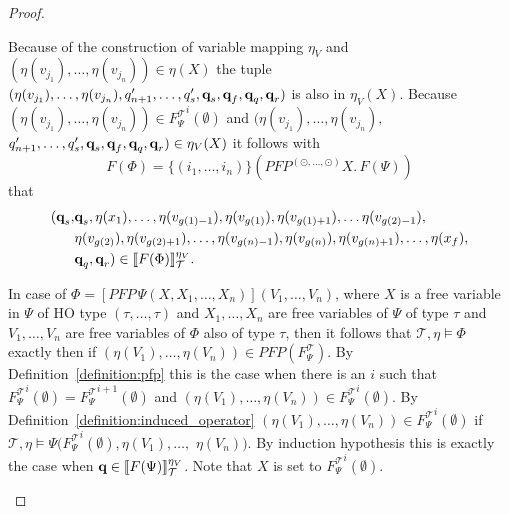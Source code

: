 \begin{proof}
\begin{compactitem}
		Because of the construction of variable mapping $\eta_V$ and $(\eta(v_{j_1}), \dots, 
        \eta(v_{j_n})) \in \eta(X)$ the
        tuple $(\eta(v_{j_1}), \dots, \eta(v_{j_n}), q_{n+1}', \dots, q_s', \emph{q}_s, \emph{q}_f,  
        \emph{q}_q,  \emph{q}_r)$ is also in $\eta_V(X)$.
         Because $(\eta(v_{j_1}), \dots, \eta(v_{j_n})) \in {F_\Psi^\mathcal{T}}^i(\emptyset)$ and $(\eta(v_{j_1}), \dots, \eta(v_{j_n}), $ $q_{n+1}', \dots, q_s', \emph{q}_s, \emph{q}_f,  
        \emph{q}_q,  \emph{q}_r) \in \eta_V(X)$ it follows with 
        \[F(\Phi) = \{(i_1, \dots, i_n)\} (PFP^{(\odot, \dots, \odot)} X.\, F(\Psi)) \]
        that 
        \begin{align*}
        (\emph{q}_s, &\emph{q}_s, \eta(x_1), \dots, \eta(v_{g(1)-1}), \eta(v_{g(1)}), \eta(v_{g(1)+1}), \dots \eta(v_{g(2)-1}),\\& \eta
            (v_{g(2)}), \eta(v_{g(2)+1}), \dots, \eta(v_{g(n)-1}), \eta(v_{g(n)}), \eta(v_{g(n)+1}), \dots, \eta
            (x_f), \\&\emph{q}_q, \emph{q}_r) \in \llbracket F(\Phi) \rrbracket_\mathcal{T}^{\eta_V}.
        \end{align*}

        \item In case of $\Phi = [PFP\,\Psi(X, X_1, \dots, X_n)](V_1, \dots, V_n)$, where $X$ is a
        free variable in $\Psi$ of HO type $(\tau, \dots, \tau)$ and $X_1, \dots, X_n$ are free 
        variables of $\Psi$ of type $\tau$ and $V_1, \dots, V_n$ are free variables of $\Phi$ also of 
        type $\tau$, then it follows that $\mathcal{T}, \eta \models \Phi$ exactly then if $(\eta(V_1), 
        \dots, \eta(V_n)) \in PFP(F_\Psi^\mathcal{T})$. By Definition~\ref{definition:pfp} this is the 
        case when there is an $i$ such that ${F_\Psi^\mathcal{T}}^i(\emptyset) = {F_\Psi^		
        \mathcal{T}}^{i+1}(\emptyset)$ and $(\eta(V_1), \dots, \eta(V_n)) \in {F_\Psi^\mathcal{T}}
        ^i(\emptyset)$. By Definition~\ref{definition:induced_operator} $(\eta(V_1), \dots, 		
        \eta(V_n)) \in {F_\Psi^\mathcal{T}}^i(\emptyset)$ if $\mathcal{T}, \eta \models \Psi({F_\Psi^
        \mathcal{T}}^{i}(\emptyset), \eta(V_1), \dots, $ $\eta(V_n))$. By induction hypothesis 
        this is exactly the case when $\emph{q} \in \llbracket F(\Psi) \rrbracket_\mathcal{T}
        ^{\eta_V}$. Note that $X$ is set to ${F_\Psi^\mathcal{T}}^{i}(\emptyset)$.
		         

\end{compactitem}
\end{proof}
